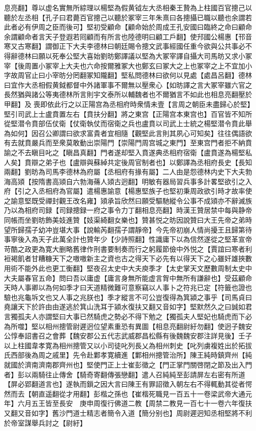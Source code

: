 息亮翻】尊以虚名實無所綜理以楊堅為假黄钺左大丞相秦王贄為上柱國百官摠己以聽於左丞相【孔子曰君薨百官摠己以聽於冢宰三年朱熹曰各摠攝已職以聽也余謂若此者必有伊周之臣而後可】堅初受顧命【顧命始於周成王孔安國曰臨終之命曰顧命余謂顧命者言天子登遐若囘顧而有所言也陸德明曰顧工戶翻】使䢴國公楊惠【邗音寒又古寒翻】謂御正下大夫李德林曰朝廷賜令摠文武事經國任重今欲與公共事必不得辭德林曰願以死奉公堅大喜始劉昉鄭譯議以堅為大冢宰譯自攝大司馬昉又求小冢宰【後周置小冢宰上大夫也六命按爾雅冢大也鄭玄曰冢大之上也冢宰之上不宜加小字故周官止曰小宰昉分罔翻冢知隴翻】堅私問德林曰欲何以見處【處昌呂翻】德林曰宜作大丞相假黄鉞都督中外諸軍事不爾無以壓衆心【如昉譯之言大冢宰雖六官之長然猶與諸公等夷德林所言則宇文泰所以輔魏者也不爾猶言不如此也相息亮翻壓於甲翻】及喪即依此行之以正陽宫為丞相府時衆情未壹【言周之朝臣未盡歸心於堅】堅引司武上士盧賁置左右【賁扶分翻】將之東宫【正陽宫本東宫也】百官皆不知所從堅潜令賁部伍仗衛【仗衛執仗而宿衛之兵也盧賁以司武上士統之楊堅潜令賁此舉為如何】因召公卿謂曰欲求富貴者宜相隨【觀堅此言則其夙心可知矣】往往偶語欲有去就賁嚴兵而至衆莫敢動出崇陽門【崇陽門周宫城之東門】至東宫門者拒不納賁諭之不去瞋目叱之【瞋昌真翻】門者遂却堅入賁遂典丞相府宿衛【盧賁遂為楊堅私人矣】賁辯之弟子也【盧辯與蘇綽共定後周官制者也】以鄭譯為丞相府長史【長知兩翻】劉昉為司馬李德林為府屬【丞相府有掾有屬】二人由是怨德林内史下大夫勃海高熲【按隋書高熲自六勃海蓨人熲古迥翻】明敏有器局習兵事多計畧堅欲引之入府【引之入丞相府為官屬】遣楊惠諭意【楊惠堅族子也堅初秉周政欲引時才故率使之諭意堅既受禪封觀王改名雍】熲承旨欣然曰願受驅馳縱令公事不成熲亦不辭滅族乃以為相府司録【司録摠録一府之事令力丁翻相息亮翻】時漢王贊居禁中每與静帝同帳而坐劉昉飾美妓進贊【妓渠綺翻女樂也】贊甚悦之昉因說贊曰大王先帝之弟時望所歸孺子幼冲豈堪大事【說輸芮翻孺子謂靜帝】今先帝初崩人情尚擾王且歸第待事寧後入為天子此萬全計也贊年少【少詩照翻】性識庸下以為信然遂從之堅革宣帝苛酷之政更為寛大删略舊律作刑書要制奏而行之躬履節儉中外悦之【賈誼曰寒者利裋褐飢者甘糟糠天下之嗷嗷新主之資也古之得天下必先有以得天下之心雖奸雄挾數用術不能外此也更工衡翻】堅夜召太史中大夫庾季才【太史掌天文歷數周制太史中大夫屬春官五命】問曰吾以庸虚【庸言身無所能虚言胷中無所有謙辭也】受茲顧命天時人事卿以為何如季才曰天道精微難可意察竊以人事卜之符兆已定【符籤也證也驗也兆龜坼文也又人事之兆朕也】季才縱言不可公豈復得為箕潁之事乎【司馬貞曰堯讓天下於許由由遂逃於箕山洗耳于潁水復扶又翻又音如字】堅默然久之曰誠如君言獨孤夫人亦謂堅曰大事已然騎虎之勢必不得下勉之【獨孤夫人堅妃也騎虎而下必為所噬】堅以相州摠管尉遲迥位望素重恐有異圖【相息亮翻尉紆勿翻】使迥子魏安公惇奉詔書召之會葬【魏安郡公五代志武威郡昌松縣有後魏魏安郡注詳見後】壬子以上柱國韋孝寛為相州摠管又以小司徒叱列長乂為相州刺史【叱列虜複姓出於拓拔氏西部後為周之戚里】先令赴鄴孝寛續進【鄴相州摠管治所】陳王純時鎮齊州【純就國於濟南濟南郡齊州也】堅使門正上士崔彭徵之【門正掌門關啓閉之節及出入門者】彭以兩騎往止傳舍【騎奇寄翻傳張戀翻】遣人召純純至彭請屏左右密有所道【屏必郢翻道言也】遂執而鎻之因大言曰陳王有罪詔徵入朝左右不得輒動其從者愕然而去【朝直遥翻從才用翻】彭楷之孫也【崔楷死職見一百五十一卷梁武帝大通元年】六月五王皆至長安　庚申周復行佛道二教【周禁二教見一百七十一卷六年復扶又翻又音如字】舊沙門道士精志者簡令入道【簡分别也】周尉遲迥知丞相堅將不利於帝室謀舉兵討之【尉紆】


